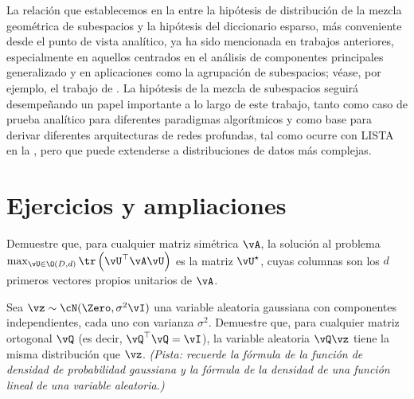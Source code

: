 \documentclass[../../book-main.tex]{subfiles}
\begin{document}
La relación que establecemos en la  entre la
hipótesis de distribución de la mezcla geométrica de subespacios y la hipótesis del
diccionario esparso, más conveniente desde el punto de vista analítico, ya ha sido mencionada en trabajos anteriores,
especialmente en aquellos centrados en el análisis de componentes principales generalizado
y en aplicaciones como la agrupación de subespacios; véase, por ejemplo, el trabajo de \textcite{GPCA}.
La hipótesis de la mezcla de subespacios seguirá desempeñando un papel importante
a lo largo de este trabajo, tanto como caso de prueba analítico para diferentes
paradigmas algorítmicos y como base para derivar diferentes arquitecturas de redes profundas,
tal como ocurre con LISTA en la , pero que puede extenderse a distribuciones de datos
más complejas.

\section{Ejercicios y ampliaciones}

\begin{exercise}\label{exercise:principal-components-derivation}
    Demuestre que, para cualquier matriz simétrica \(\vA\), la solución al problema
    \(\max_{\vU \in \O(D, d)}\tr\left(\vU^{\top}\vA\vU\right)\) es la matriz
    \(\vU^{\star}\), cuyas columnas son los \(d\) primeros vectores propios unitarios
    de \(\vA\).
\end{exercise}

\begin{exercise}\label{exercise:gaussian-rot-invar}
    Sea $\vz \sim \cN(\Zero, \sigma^2 \vI)$ una variable aleatoria gaussiana
    con componentes independientes, cada uno con varianza $\sigma^2$.
    Demuestre que, para cualquier matriz ortogonal $\vQ$ (es decir, $\vQ^\top \vQ =
    \vI$), la variable aleatoria $\vQ \vz$ tiene la misma distribución que $\vz$.
    \textit{(Pista: recuerde la fórmula de la función de densidad de probabilidad gaussiana
            y la fórmula de la densidad de una función lineal
    de una variable aleatoria.) }
\end{exercise}
\end{document}
